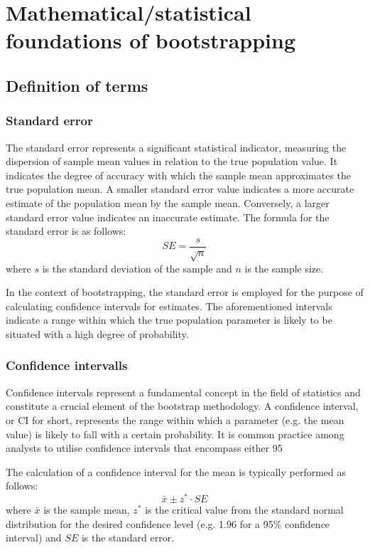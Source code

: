 

\chapter{Mathematical/statistical foundations of bootstrapping} \label{Foundations}


\section{Definition of terms}

\subsection{Standard error}
The standard error represents a significant statistical indicator, measuring the dispersion of sample mean values in relation to the true population value. It indicates the degree of accuracy with which the sample mean approximates the true population mean. A smaller standard error value indicates a more accurate estimate of the population mean by the sample mean. Conversely, a larger standard error value indicates an inaccurate estimate. 
The formula for the standard error is as follows: 
\[
SE = \frac{s}{\sqrt{n}}
\]
where \( s \) is the standard deviation of the sample and \( n \) is the sample size.

In the context of bootstrapping, the standard error is employed for the purpose of calculating confidence intervals for estimates. The aforementioned intervals indicate a range within which the true population parameter is likely to be situated with a high degree of probability. 


\subsection{Confidence intervalls}
Confidence intervals represent a fundamental concept in the field of statistics and constitute a crucial element of the bootstrap methodology. A confidence interval, or CI for short, represents the range within which a parameter (e.g. the mean value) is likely to fall with a certain probability. It is common practice among analysts to utilise confidence intervals that encompass either 95%

The calculation of a confidence interval for the mean is typically performed as follows:
\[
\bar{x} \pm z^* \cdot SE
\]
where \( \bar{x} \) is the sample mean, \( z^* \) is the critical value from the standard normal distribution for the desired confidence level (e.g. 1.96 for a 95\% confidence interval) and \( SE \) is the standard error.


